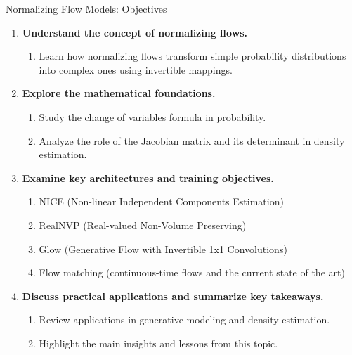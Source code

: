 \begin{frame}[allowframebreaks]{Normalizing Flow Models: Objectives}
    \begin{enumerate}
        \setlength{\itemsep}{-0.1em}
        \item \textbf{Understand the concept of normalizing flows.}
        \begin{enumerate}
            \setlength{\itemsep}{-0.5em}
            \item Learn how normalizing flows transform simple probability distributions into complex ones using invertible mappings.
        \end{enumerate}
        \item \textbf{Explore the mathematical foundations.}
        \begin{enumerate}
            \setlength{\itemsep}{-0.5em}
            \item Study the change of variables formula in probability.
            \item Analyze the role of the Jacobian matrix and its determinant in density estimation.
        \end{enumerate}
        \item \textbf{Examine key architectures and training objectives.}
        \begin{enumerate}
            \setlength{\itemsep}{-0.5em}
            \item NICE (Non-linear Independent Components Estimation)
            \item RealNVP (Real-valued Non-Volume Preserving)
            \item Glow (Generative Flow with Invertible 1x1 Convolutions)
            \item Flow matching (continuous-time flows and the current state of the art)
        \end{enumerate}
        \item \textbf{Discuss practical applications and summarize key takeaways.}
        \begin{enumerate}
            \setlength{\itemsep}{-0.5em}
            \item Review applications in generative modeling and density estimation.
            \item Highlight the main insights and lessons from this topic.
        \end{enumerate}
    \end{enumerate}
\end{frame}

